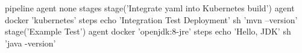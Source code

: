\begin{boxedverbatim}
pipeline {
    agent none 
    stages {
        stage('Integrate yaml into Kubernetes build') {
            agent { docker 'kubernetes' } 
            steps {
                echo 'Integration Test Deployment'
                sh 'mvn --version'
            }
        }
        stage('Example Test') {
            agent { docker 'openjdk:8-jre' } 
            steps {
                echo 'Hello, JDK'
                sh 'java -version'
            }
        }
    }
}
\end{boxedverbatim}